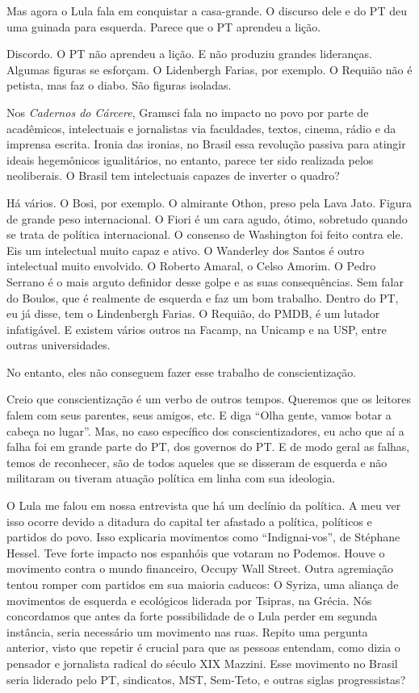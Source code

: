  Mas agora o Lula fala em conquistar a casa-grande. O discurso dele e
do PT deu uma guinada para esquerda. Parece que o PT aprendeu a lição.

 Discordo. O PT não aprendeu a lição. E não produziu grandes
lideranças. Algumas figuras se esforçam. O Lidenbergh Farias, por
exemplo. O Requião não é petista, mas faz o diabo. São figuras isoladas.

 Nos \emph{Cadernos do Cárcere}, Gramsci fala no impacto no povo por
parte de acadêmicos, intelectuais e jornalistas via faculdades, textos,
cinema, rádio e da imprensa escrita. Ironia das ironias, no Brasil essa
revolução passiva para atingir ideais hegemônicos igualitários, no
entanto, parece ter sido realizada pelos neoliberais. O Brasil tem
intelectuais capazes de inverter o quadro?

 Há vários. O Bosi, por exemplo. O almirante Othon, preso pela Lava
Jato. Figura de grande peso internacional. O Fiori é um cara agudo,
ótimo, sobretudo quando se trata de política internacional. O consenso
de Washington foi feito contra ele. Eis um intelectual muito capaz e
ativo. O Wanderley dos Santos é outro intelectual muito envolvido. O
Roberto Amaral, o Celso Amorim. O Pedro Serrano é o mais arguto
definidor desse golpe e as suas consequências. Sem falar do Boulos, que
é realmente de esquerda e faz um bom trabalho. Dentro do PT, eu já
disse, tem o Lindenbergh Farias. O Requião, do PMDB, é um lutador
infatigável. E existem vários outros na Facamp, na Unicamp e na USP,
entre outras universidades.

 No entanto, eles não conseguem fazer esse trabalho de
conscientização.

 Creio que conscientização é um verbo de outros tempos. Queremos que
os leitores falem com seus parentes, seus amigos, etc. E diga ``Olha
gente, vamos botar a cabeça no lugar''. Mas, no caso específico dos
conscientizadores, eu acho que aí a falha foi em grande parte do PT, dos
governos do PT. E de modo geral as falhas, temos de reconhecer, são de
todos aqueles que se disseram de esquerda e não militaram ou tiveram
atuação política em linha com sua ideologia.

 O Lula me falou em nossa entrevista que há um declínio da política. A
meu ver isso ocorre devido a ditadura do capital ter afastado a
política, políticos e partidos do povo. Isso explicaria movimentos como
``Indignai-vos'', de Stéphane Hessel. Teve forte impacto nos espanhóis
que votaram no Podemos. Houve o movimento contra o mundo financeiro,
Occupy Wall Street. Outra agremiação tentou romper com partidos em sua
maioria caducos: O Syriza, uma aliança de movimentos de esquerda e
ecológicos liderada por Tsipras, na Grécia. Nós concordamos que antes da
forte possibilidade de o Lula perder em segunda instância, seria
necessário um movimento nas ruas. Repito uma pergunta anterior, visto
que repetir é crucial para que as pessoas entendam, como dizia o
pensador e jornalista radical do século XIX Mazzini. Esse movimento no
Brasil seria liderado pelo PT, sindicatos, MST, Sem-Teto, e outras
siglas progressistas?

